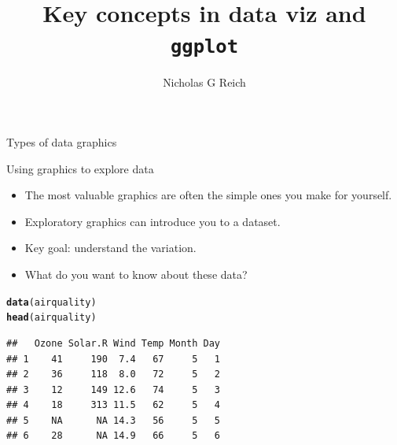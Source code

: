 \documentclass[table]{beamer}\usepackage[]{graphicx}\usepackage[]{xcolor}
\title{Key concepts in data viz and {\tt ggplot}}
\author{Nicholas G Reich}
\makeatletter
\newcommand{\hlstd}[1]{\textcolor[rgb]{0.345,0.345,0.345}{#1}}%
\newcommand{\hlkwd}[1]{\textcolor[rgb]{0.737,0.353,0.396}{\textbf{#1}}}%
\newenvironment{kframe}{%
 \def\at@end@of@kframe{}%
 \ifinner\ifhmode%
  \def\at@end@of@kframe{\end{minipage}}%
  \begin{minipage}{\columnwidth}%
 \fi\fi%
 \def\FrameCommand##1{\hskip\@totalleftmargin \hskip-\fboxsep
 \colorbox{shadecolor}{##1}\hskip-\fboxsep
     \hskip-\linewidth \hskip-\@totalleftmargin \hskip\columnwidth}%
 \MakeFramed {\advance\hsize-\width
   \@totalleftmargin\z@ \linewidth\hsize
   \@setminipage}}%
 {\par\unskip\endMakeFramed%
 \at@end@of@kframe}
\newenvironment{knitrout}{}{} %
\makeatother
\begin{document}
\begin{frame}[plain]
	\titlepage
\end{frame}




\begin{frame}

\centering
\Huge Types of data graphics


\end{frame}


\begin{frame}[fragile]{Using graphics to explore data}

\begin{itemize}
    \item The most valuable graphics are often the simple ones you make for yourself.
    \item Exploratory graphics can introduce you to a dataset.
    \item Key goal: understand the variation.
    \item What do you want to know about these data?
\end{itemize}


\begin{knitrout}
\color{fgcolor}\begin{kframe}
\begin{alltt}
\hlkwd{data}\hlstd{(airquality)}
\hlkwd{head}\hlstd{(airquality)}
\end{alltt}
\begin{verbatim}
##   Ozone Solar.R Wind Temp Month Day
## 1    41     190  7.4   67     5   1
## 2    36     118  8.0   72     5   2
## 3    12     149 12.6   74     5   3
## 4    18     313 11.5   62     5   4
## 5    NA      NA 14.3   56     5   5
## 6    28      NA 14.9   66     5   6
\end{verbatim}
\end{kframe}
\end{knitrout}

\end{frame}

\end{document}
